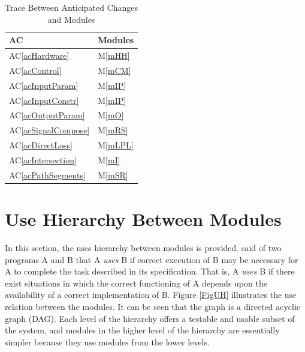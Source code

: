 \documentclass[12pt, titlepage]{article}
\newcommand{\acref}[1]{AC\ref{#1}}
\newcommand{\mref}[1]{M\ref{#1}}
\begin{document}
\begin{table}[H]
\centering
\begin{tabular}{p{} p{}}
\toprule
\textbf{AC} & \textbf{Modules}\\
\midrule
\acref{acHardware} & \mref{mHH}\\
\acref{acControl} & \mref{mCM}\\
\acref{acInputParam} & \mref{mIP}\\
\acref{acInputConstr} & \mref{mIP}\\
\acref{acOutputParam} & \mref{mO}\\
\acref{acSignalCompose} & \mref{mRS}\\
\acref{acDirectLoss} & \mref{mLPL}\\
\acref{acIntersection} & \mref{mI}\\
\acref{acPathSegments} & \mref{mSR}\\
\bottomrule
\end{tabular}
\caption{Trace Between Anticipated Changes and Modules}
\label{TblACT}
\end{table}

\section{Use Hierarchy Between Modules} \label{SecUse}

In this section, the uses hierarchy between modules is
provided. \citet{Parnas1978} said of two programs A and B that A {\em uses} B if
correct execution of B may be necessary for A to complete the task described in
its specification. That is, A {\em uses} B if there exist situations in which
the correct functioning of A depends upon the availability of a correct
implementation of B.  Figure \ref{FigUH} illustrates the use relation between
the modules. It can be seen that the graph is a directed acyclic graph
(DAG). Each level of the hierarchy offers a testable and usable subset of the
system, and modules in the higher level of the hierarchy are essentially simpler
because they use modules from the lower levels.
\end{document}
